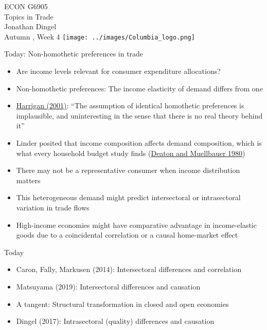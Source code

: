 \documentclass[11pt,notes=hide,aspectratio=169]{beamer}
\begin{document}
\begin{frame}[plain]
\begin{center}
\large
\textcolor{columbiadarkblue}{ECON G6905\\
Topics in Trade\\ 
Jonathan Dingel\\
Autumn \the\year, Week 4}
\vfill 
\texttt{[image: ../images/Columbia\_logo.png]}
\end{center}
\end{frame}
\begin{frame}{Today: Non-homothetic preferences in trade}
\begin{itemize}
	\item Are income levels relevant for consumer expenditure allocations?
	\item Non-homothetic preferences: The income elasticity of demand differs from one
	\item {\small \href{https://www.nber.org/papers/w8675}{Harrigan (2001)}: ``The assumption of identical homothetic preferences is implausible, and uninteresting in the sense that there is no real theory behind it''}
	\item Linder posited that income composition affects demand composition, which is what every household budget study finds (\href{http://www.cambridge.org/us/academic/subjects/economics/microeconomics/economics-and-consumer-behavior?format=PB&isbn=9780521296762}{Deaton and Muellbauer 1980})
	\item There may not be a representative consumer when income distribution matters
	\item This heterogeneous demand might predict intersectoral or intrasectoral variation in trade flows
	\item {High-income economies might have comparative advantage in income-elastic goods due to a coincidental correlation or a causal home-market effect\par}
\end{itemize}
\end{frame}
\begin{frame}{Today}
\begin{itemize}
\item Caron, Fally, Markusen (2014): Intersectoral differences and correlation
\item Matsuyama (2019): Intersectoral differences and causation
\item A tangent: Structural transformation in closed and open economies
\item Dingel (2017): Intrasectoral (quality) differences and causation
\end{itemize}
\end{frame}
\end{document}
